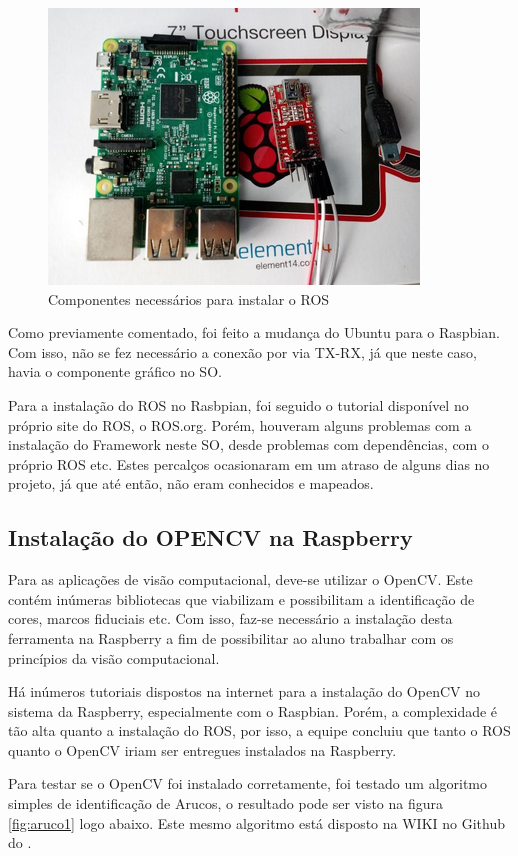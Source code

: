 \begin{figure}[H]
	\centering
	\includegraphics[scale=0.8, angle=0]{Figures/TX-RXconexao.png}
	\caption{Componentes necessários para instalar o ROS}
	\label{fig:txrx}
\end{figure}

Como previamente comentado, foi feito a mudança do Ubuntu para o Raspbian. Com isso, não se fez necessário a conexão por via TX-RX, já que neste caso, havia o componente gráfico no SO.

Para a instalação do ROS no Rasbpian, foi seguido o tutorial disponível no próprio site do ROS, o ROS.org. Porém, houveram alguns problemas com a instalação do Framework neste SO, desde problemas com dependências, com o próprio ROS etc. Estes percalços ocasionaram em um atraso de alguns dias no projeto, já que até então, não eram conhecidos e mapeados. 

\subsection{Instalação do OPENCV na Raspberry}
Para as aplicações de visão computacional, deve-se utilizar o OpenCV. Este contém inúmeras bibliotecas que viabilizam e possibilitam a identificação de cores, marcos fiduciais etc. Com isso, faz-se necessário a instalação desta ferramenta na Raspberry a fim de possibilitar ao aluno trabalhar com os princípios da visão computacional.

Há inúmeros tutoriais dispostos na internet para a instalação do OpenCV no sistema da Raspberry, especialmente com o Raspbian. Porém, a complexidade é tão alta quanto a instalação do ROS, por isso, a equipe concluiu que tanto o ROS quanto o OpenCV iriam ser entregues instalados na Raspberry.

Para testar se o OpenCV foi instalado corretamente, foi testado um algoritmo simples de identificação de Arucos, o resultado pode ser visto na figura \ref{fig:aruco1} logo abaixo. Este mesmo algoritmo está disposto na WIKI no Github do \cite{wikilearn}.

